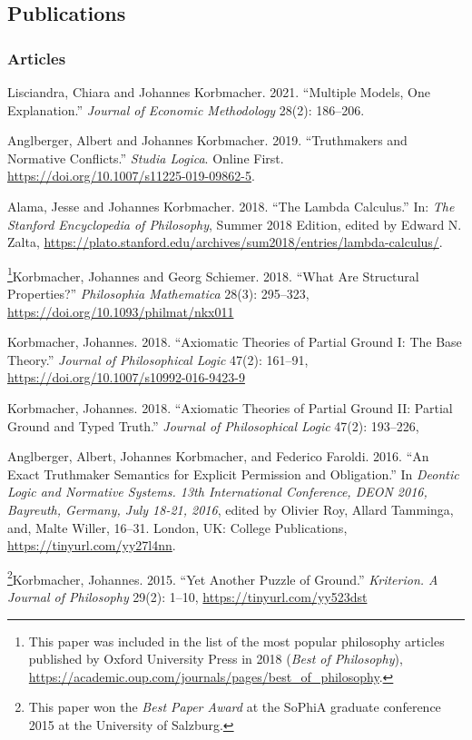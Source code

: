 \subsection*{Publications}
\subsubsection*{Articles}
\begin{etaremune}
  \item Lisciandra, Chiara and Johannes Korbmacher. 2021. ``Multiple Models, One Explanation.'' \emph{Journal of Economic Methodology} 28(2): 186--206.
  \item Anglberger, Albert and Johannes Korbmacher. 2019. ``Truthmakers and Normative Conflicts.'' \emph{Studia Logica}. Online First. \url{https://doi.org/10.1007/s11225-019-09862-5}.
  \item Alama, Jesse and Johannes Korbmacher. 2018. ``The Lambda Calculus.'' In: \emph{The Stanford Encyclopedia of Philosophy}, Summer 2018 Edition, edited by Edward N. Zalta, \url{https://plato.stanford.edu/archives/sum2018/entries/lambda-calculus/}.
  \item \footnote{This paper was included in the list of the most popular philosophy articles published by Oxford University Press in 2018 (\emph{Best of Philosophy}), \url{https://academic.oup.com/journals/pages/best_of_philosophy}.}Korbmacher, Johannes and Georg Schiemer. 2018. ``What Are Structural Properties?'' \emph{Philosophia Mathematica} 28(3): 295--323, \url{https://doi.org/10.1093/philmat/nkx011}
  \item Korbmacher, Johannes. 2018. ``Axiomatic Theories of Partial Ground I: The Base Theory.'' \emph{Journal of Philosophical Logic} 47(2): 161--91, \url{https://doi.org/10.1007/s10992-016-9423-9}
  \item Korbmacher, Johannes. 2018. ``Axiomatic Theories of Partial Ground II: Partial Ground and Typed Truth.'' \emph{Journal of Philosophical Logic} 47(2): 193--226,
  \item Anglberger, Albert, Johannes Korbmacher, and Federico Faroldi. 2016. ``An Exact Truthmaker Semantics for Explicit Permission and Obligation.'' In \emph{Deontic Logic and Normative Systems. 13th International Conference, DEON 2016, Bayreuth, Germany, July 18-21, 2016}, edited by Olivier Roy, Allard Tamminga, and, Malte Willer, 16--31. London, UK: College Publications, \url{https://tinyurl.com/yy27l4nn}.
  \item \label{best-paper}\footnote{This paper won the \emph{Best Paper Award} at the SoPhiA graduate conference 2015 at the University of Salzburg.}Korbmacher, Johannes. 2015. ``Yet Another Puzzle of Ground.'' \emph{Kriterion. A Journal of Philosophy} 29(2): 1--10, \url{https://tinyurl.com/yy523dst}

\end{etaremune}
